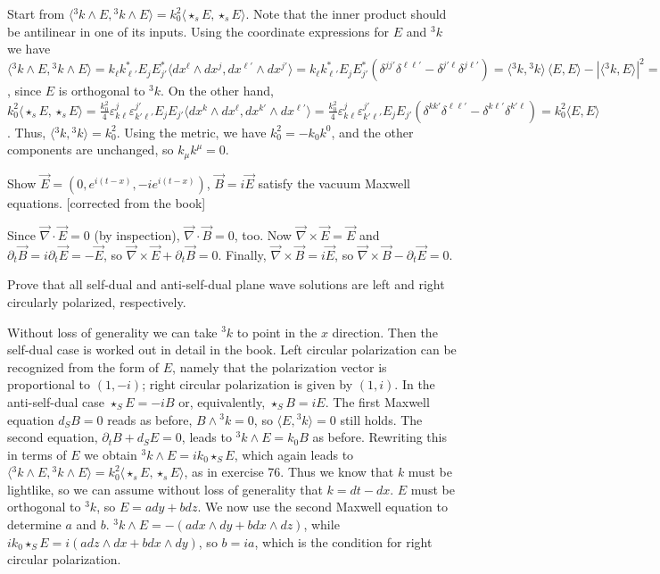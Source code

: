 Start from $\langle {}^3k\wedge E,{}^3k\wedge E\rangle=k_0^2\langle\star_s E,\star_s E\rangle$. 
Note that the inner product should be antilinear in one of its inputs. Using the coordinate expressions for $E$
and ${}^3k$ we have $\langle {}^3k\wedge E,{}^3k\wedge E\rangle=k_\ell k_{\ell'}^*E_j E_{j'}^*\langle dx^\ell\wedge dx^j,dx^{\ell'}\wedge dx^{j'}\rangle=k_\ell k_{\ell'}^*E_j E_{j'}^*(\delta^{j j'}\delta^{\ell\ell'}-\delta^{j'\ell}\delta^{j\ell'})=\langle {}^3k,{}^3k\rangle\,\langle E,E\rangle-|\langle {}^3k,E\rangle|^2=\langle {}^3k,{}^3k\rangle\,\langle E,E\rangle$, since $E$ is orthogonal to ${}^3k$.
On the other hand, $k_0^2\langle\star_s E,\star_s E\rangle=\frac{k_0^2}{4}\varepsilon^j_{k\ell}\varepsilon^{j'}_{k'\ell'}E_jE_{j'}\langle dx^k\wedge dx^\ell,dx^{k'}\wedge dx^{\ell'}\rangle=\frac{k_0^2}{4}\varepsilon^j_{k\ell}\varepsilon^{j'}_{k'\ell'}E_jE_{j'}(\delta^{kk'}\delta^{\ell \ell'}-\delta^{k\ell'}\delta^{k'\ell})=k_0^2\langle E,E\rangle$.
Thus, $\langle {}^3k,{}^3k\rangle=k_0^2$. Using the metric, we have $k_0^2=-k_0k^0$, and the 
other components are unchanged, so $k_\mu k^\mu=0$.


\begin{p}%
{Show $\vec{E}=(0,e^{i(t-x)},-ie^{i(t-x)})$, $\vec{B}=i\vec{E}$ satisfy the vacuum Maxwell equations. [corrected from the book]}
\end{p}

Since $\vec{\nabla}\cdot \vec{E}=0$ (by inspection), 
$\vec{\nabla}\cdot \vec{B}=0$, too. Now $\vec{\nabla}\times \vec{E}=\vec{E}$ and $\partial_t \vec{B}=i\partial_t \vec{E}=-\vec{E}$, so $\vec{\nabla}\times \vec{E}+\partial_t \vec{B}=0$. Finally,
$ \vec{\nabla}\times \vec{B}=i\vec{E}$, so $\vec{\nabla}\times \vec{B}-\partial_t \vec{E}=0$.

\begin{p}%
{Prove that all self-dual and anti-self-dual plane wave solutions are left and right circularly polarized, respectively.}
\end{p}

Without loss of generality we can take ${}^3k$ to point in the $x$ direction. Then the self-dual case is worked
out in detail in the book. Left circular polarization can be recognized from the form of $E$, namely that the 
polarization vector is proportional to $(1,-i)$; right circular polarization is given by $(1,i)$. 
In the anti-self-dual case $\star_S E=-iB$ or, equivalently,
$\star_SB=iE$. The first Maxwell equation $d_SB=0$ reads as before, $B\wedge {}^3k=0$, so
$\langle E,{}^3k\rangle=0$ still holds. The second equation, $\partial_t B+d_SE=0$, leads to ${}^3k\wedge E=k_0B$ as before. Rewriting this in terms of $E$ we obtain ${}^3k\wedge E=ik_0\star_SE$, which
again leads to $\langle {}^3k\wedge E,{}^3k\wedge E\rangle=k_0^2\langle\star_s E,\star_s E\rangle$, as 
in exercise 76. Thus we know that $k$ must be lightlike, so we can assume without loss of generality 
that $k=dt-dx$. $E$ must be orthogonal to ${}^3k$, so $E=a dy+bdz$. We now use the second 
Maxwell equation to determine $a$ and $b$. ${}^3k\wedge E=-(a dx\wedge dy+b dx\wedge dz)$, 
while $ik_0\star_SE=i(a dz\wedge dx+b dx\wedge dy)$, so $b=ia$, which is the condition for right circular
polarization.

